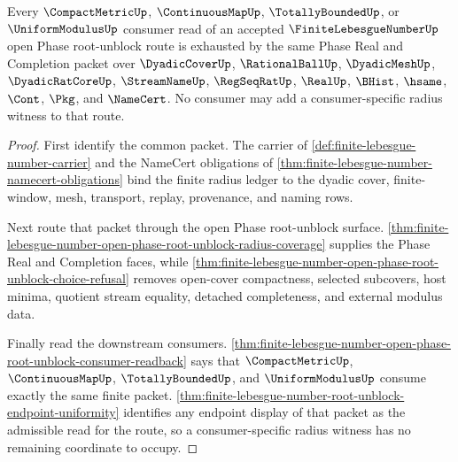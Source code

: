 \begin{theorem}
\label{thm:finite-lebesgue-number-l10-consumer-radius-exhaustion}
Every $\CompactMetricUp$, $\ContinuousMapUp$, $\TotallyBoundedUp$, or $\UniformModulusUp$ consumer read of an accepted $\FiniteLebesgueNumberUp$ open Phase root-unblock route is exhausted by the same Phase Real and Completion packet over $\DyadicCoverUp$, $\RationalBallUp$, $\DyadicMeshUp$, $\DyadicRatCoreUp$, $\StreamNameUp$, $\RegSeqRatUp$, $\RealUp$, $\BHist$, $\hsame$, $\Cont$, $\Pkg$, and $\NameCert$. No consumer may add a consumer-specific radius witness to that route.
\end{theorem}
\begin{proof}
First identify the common packet. The carrier of \autoref{def:finite-lebesgue-number-carrier} and the NameCert obligations of \autoref{thm:finite-lebesgue-number-namecert-obligations} bind the finite radius ledger to the dyadic cover, finite-window, mesh, transport, replay, provenance, and naming rows.

Next route that packet through the open Phase root-unblock surface. \autoref{thm:finite-lebesgue-number-open-phase-root-unblock-radius-coverage} supplies the Phase Real and Completion faces, while \autoref{thm:finite-lebesgue-number-open-phase-root-unblock-choice-refusal} removes open-cover compactness, selected subcovers, host minima, quotient stream equality, detached completeness, and external modulus data.

Finally read the downstream consumers. \autoref{thm:finite-lebesgue-number-open-phase-root-unblock-consumer-readback} says that $\CompactMetricUp$, $\ContinuousMapUp$, $\TotallyBoundedUp$, and $\UniformModulusUp$ consume exactly the same finite packet. \autoref{thm:finite-lebesgue-number-root-unblock-endpoint-uniformity} identifies any endpoint display of that packet as the admissible read for the route, so a consumer-specific radius witness has no remaining coordinate to occupy.
\end{proof}

